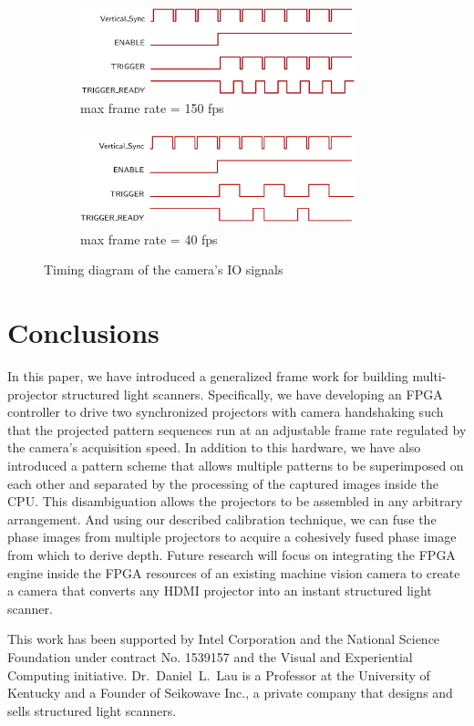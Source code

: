 \documentclass[]{spie}  %
\begin{document}
\begin{figure}
\centering
\begin{subfigure}{.5\textwidth}
  \centering
  \includegraphics[width=8cm]{phase2.png}
  \caption{max frame rate = 150 fps}
  \label{fig:sub3}
\end{subfigure}%
\begin{subfigure}{.5\textwidth}
  \centering
   \includegraphics[width=8cm]{gpio.png}
  \caption{max frame rate = 40 fps}
  \label{fig:sub4}
\end{subfigure}
\caption{Timing diagram of the camera's IO signals}
\label{Fig:7}
\end{figure}


\section{Conclusions}
In this paper, we have introduced a generalized frame work for building multi-projector structured light scanners. Specifically, we have developing an FPGA controller to drive two synchronized projectors with camera handshaking such that the projected pattern sequences run at an adjustable frame rate regulated by the camera's acquisition speed.  In addition to this hardware, we have also introduced a pattern scheme that allows multiple patterns to be superimposed on each other and separated by the processing of the captured images inside the CPU.  This disambiguation allows the projectors to be assembled in any arbitrary arrangement.  And using our described calibration technique, we can fuse the phase images from multiple projectors to acquire a cohesively fused phase image from which to derive depth. Future research will focus on integrating the FPGA engine inside the FPGA resources of an existing machine vision camera to create a camera that converts any HDMI projector into an instant structured light scanner.

\acknowledgments
This work has been supported by Intel Corporation and the National Science Foundation under contract No. 1539157 and the Visual and Experiential Computing initiative. Dr.~Daniel~L.~Lau is a Professor at the University of Kentucky and a Founder of Seikowave Inc., a private company that designs and sells structured light scanners.

\end{document}
